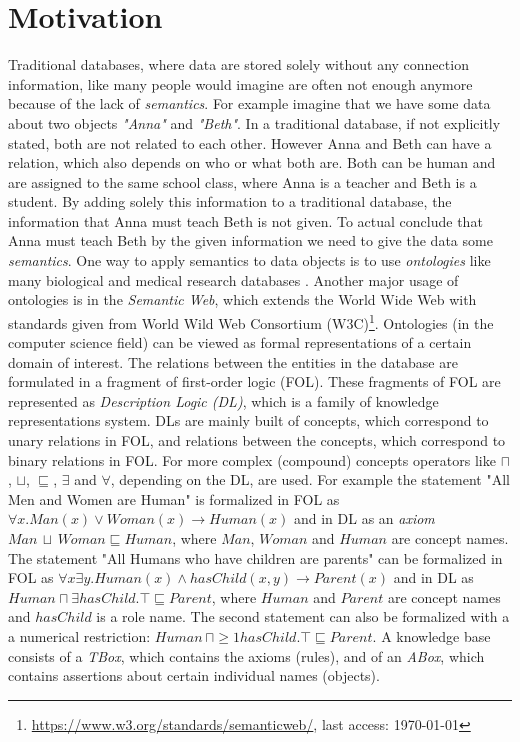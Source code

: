 \documentclass{book}
\theoremstyle{break}
\theoremstyle{definition}
\begin{document}
\section{Motivation}
Traditional databases, where data are stored solely without any connection information, like many people would imagine are often not enough anymore because of the lack of \textit{semantics}. For example imagine that we have some data about two objects \textit{"Anna"} and \textit{"Beth"}. In a traditional database, if not explicitly stated, both are not related to each other. However Anna and Beth can have a relation, which also depends on who or what both are. Both can be human and are assigned to the same school class, where Anna is a teacher and Beth is a student. By adding solely this information to a traditional database, the information that Anna must teach Beth is not given. To actual conclude that Anna must teach Beth by the given information we need to give the data some \textit{semantics}. One way to apply semantics to data objects is to use \textit{ontologies} like many biological and medical research databases \cite{bio}. Another major usage of ontologies is in the \textit{Semantic Web}, which extends the World Wide Web with standards given from World Wild Web Consortium (W3C)\footnote{\url{https://www.w3.org/standards/semanticweb/}, last access: \today}. Ontologies (in the computer science field) can be viewed as formal representations of a certain domain of interest. The relations between the entities in the database are formulated in a fragment of first-order logic (FOL). These fragments of FOL are represented as \textit{Description Logic (DL)}, which is a family of knowledge representations system. DLs are mainly built of concepts, which correspond to unary relations in FOL, and relations between the concepts, which correspond to binary relations in FOL. For more complex (compound) concepts operators like $\sqcap$, $\sqcup$, $\sqsubseteq$, $\exists$ and $\forall$, depending on the DL, are used. For example the statement "All Men and Women are Human" is formalized in FOL as $\forall x.Man(x)\vee Woman(x)\rightarrow Human(x)$ and in DL as an \textit{axiom} $Man\, \sqcup\, Woman\sqsubseteq Human$, where $Man$, $Woman$ and $Human$ are concept names. The statement "All Humans who have children are parents" can be formalized in FOL as $\forall x \exists y. Human(x)\wedge hasChild(x,y)\rightarrow Parent(x)$ and in DL as $Human\sqcap \exists hasChild.\top \sqsubseteq Parent$, where $Human$ and $Parent$ are concept names and $hasChild$ is a role name. The second statement can also be formalized with a a numerical restriction: $Human \,\sqcap \geq 1 hasChild.\top\sqsubseteq Parent$. A knowledge base consists of a \textit{TBox}, which contains the axioms (rules), and of an \textit{ABox}, which contains assertions about certain individual names (objects). \\ 
\end{document}

